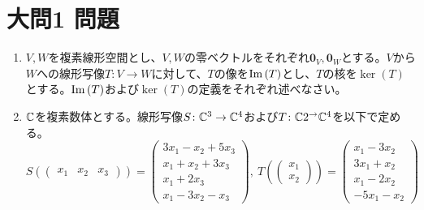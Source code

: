 \documentclass[dvipdfmx]{jsreport}
\begin{document}
\section{大問1 問題}
\begin{tcolorbox} %
\begin{enumerate}
    \item $V, W$を複素線形空間とし、$V, W$の零ベクトルをそれぞれ$\bm{0}_V, \bm{0}_W$とする。$V$から$W$への線形写像$T\colon V\to W$に対して、$T$の像を$\operatorname{Im}{(T)}$とし、$T$の核を$\ker{(T)}$とする。$\operatorname{Im}{(T)}$および$\ker{(T)}$の定義をそれぞれ述べなさい。
    \item $\mathbb{C}$を複素数体とする。線形写像$S\colon \mathbb{C}^3\to \mathbb{C}^4$および$T\colon \mathbb{C}2^\to \mathbb{C}^4$を以下で定める。
\begin{equation*}
    S\left(\begin{pmatrix}x_1& x_2& x_3\end{pmatrix}\right)= 
    \begin{pmatrix}
        3x_1- x_2+ 5x_3\\
        x_1+ x_2+ 3x_3\\
        x_1+ 2x_3\\
        x_1- 3x_2- x_3
    \end{pmatrix},\ 
    T\left(\begin{pmatrix}x_1\\ x_2\end{pmatrix}\right)= 
    \begin{pmatrix}
        x_1- 3x_2\\
        3x_1+ x_2\\
        x_1- 2x_2\\
        -5x_1- x_2
    \end{pmatrix}
\end{equation*}
\end{enumerate}
\end{tcolorbox}
\end{document}
